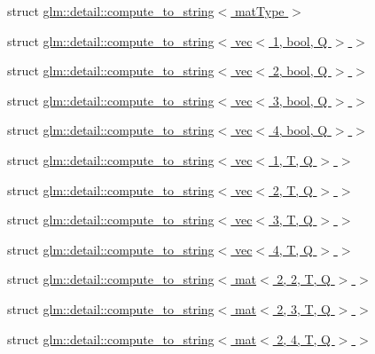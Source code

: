 \begin{DoxyCompactItemize}
\item 
struct \hyperlink{structglm_1_1detail_1_1compute__to__string}{glm\+::detail\+::compute\+\_\+to\+\_\+string$<$ mat\+Type $>$}
\item 
struct \hyperlink{structglm_1_1detail_1_1compute__to__string_3_01vec_3_011_00_01bool_00_01Q_01_4_01_4}{glm\+::detail\+::compute\+\_\+to\+\_\+string$<$ vec$<$ 1, bool, Q $>$ $>$}
\item 
struct \hyperlink{structglm_1_1detail_1_1compute__to__string_3_01vec_3_012_00_01bool_00_01Q_01_4_01_4}{glm\+::detail\+::compute\+\_\+to\+\_\+string$<$ vec$<$ 2, bool, Q $>$ $>$}
\item 
struct \hyperlink{structglm_1_1detail_1_1compute__to__string_3_01vec_3_013_00_01bool_00_01Q_01_4_01_4}{glm\+::detail\+::compute\+\_\+to\+\_\+string$<$ vec$<$ 3, bool, Q $>$ $>$}
\item 
struct \hyperlink{structglm_1_1detail_1_1compute__to__string_3_01vec_3_014_00_01bool_00_01Q_01_4_01_4}{glm\+::detail\+::compute\+\_\+to\+\_\+string$<$ vec$<$ 4, bool, Q $>$ $>$}
\item 
struct \hyperlink{structglm_1_1detail_1_1compute__to__string_3_01vec_3_011_00_01T_00_01Q_01_4_01_4}{glm\+::detail\+::compute\+\_\+to\+\_\+string$<$ vec$<$ 1, T, Q $>$ $>$}
\item 
struct \hyperlink{structglm_1_1detail_1_1compute__to__string_3_01vec_3_012_00_01T_00_01Q_01_4_01_4}{glm\+::detail\+::compute\+\_\+to\+\_\+string$<$ vec$<$ 2, T, Q $>$ $>$}
\item 
struct \hyperlink{structglm_1_1detail_1_1compute__to__string_3_01vec_3_013_00_01T_00_01Q_01_4_01_4}{glm\+::detail\+::compute\+\_\+to\+\_\+string$<$ vec$<$ 3, T, Q $>$ $>$}
\item 
struct \hyperlink{structglm_1_1detail_1_1compute__to__string_3_01vec_3_014_00_01T_00_01Q_01_4_01_4}{glm\+::detail\+::compute\+\_\+to\+\_\+string$<$ vec$<$ 4, T, Q $>$ $>$}
\item 
struct \hyperlink{structglm_1_1detail_1_1compute__to__string_3_01mat_3_012_00_012_00_01T_00_01Q_01_4_01_4}{glm\+::detail\+::compute\+\_\+to\+\_\+string$<$ mat$<$ 2, 2, T, Q $>$ $>$}
\item 
struct \hyperlink{structglm_1_1detail_1_1compute__to__string_3_01mat_3_012_00_013_00_01T_00_01Q_01_4_01_4}{glm\+::detail\+::compute\+\_\+to\+\_\+string$<$ mat$<$ 2, 3, T, Q $>$ $>$}
\item 
struct \hyperlink{structglm_1_1detail_1_1compute__to__string_3_01mat_3_012_00_014_00_01T_00_01Q_01_4_01_4}{glm\+::detail\+::compute\+\_\+to\+\_\+string$<$ mat$<$ 2, 4, T, Q $>$ $>$}

\end{DoxyCompactItemize}
